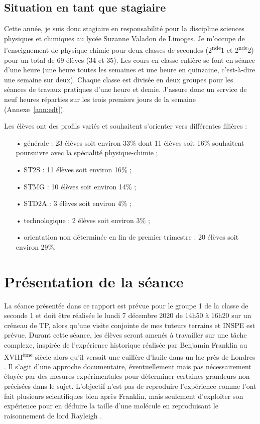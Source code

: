 \documentclass[12pt,a4paper, fleqn]{report}
\newcommand{\seconde}{2\textsuperscript{nde}}
\begin{document}
\subsection{Situation en tant que stagiaire}

Cette année, je suis donc stagiaire en responsabilité pour la discipline sciences physiques et chimiques au lycée Suzanne Valadon de Limoges.
Je m'occupe de l'enseignement de physique-chimie pour deux classes de secondes (\seconde1 et \seconde2) pour un total de 69 élèves (34 et 35).
Les cours en classe entière se font en séance d'une heure (une heure toutes les semaines et une heure en quinzaine, c'est-à-dire une semaine sur deux).
Chaque classe est divisée en deux groupes pour les séances de travaux pratiques d'une heure et demie.
J'assure donc un service de neuf heures réparties sur les trois premiers jours de la semaine (Annexe~\ref{ann:edt}).

Les élèves ont des profils variés et souhaitent s'orienter vers différentes filières :
\begin{itemize}
\item[•] générale : 23 élèves soit environ \unit{33}{\%} dont 11 élèves soit \unit{16}{\%} souhaitent poursuivre avec la spécialité physique-chimie ;
\item[•] ST2S : 11 élèves soit environ \unit{16}{\%} ;
\item[•] STMG : 10 élèves soit environ \unit{14}{\%} ;
\item[•] STD2A : 3 élèves soit environ \unit{4}{\%} ;
\item[•] technologique : 2 élèves soit environ \unit{3}{\%} ;
\item[•] orientation non déterminée en fin de premier trimestre : 20 élèves soit environ \unit{29}{\%}.
\end{itemize}

\section{Présentation de la séance}

La séance présentée dans ce rapport est prévue pour le groupe 1 de la classe de seconde 1 et doit être réalisée le lundi 7 décembre 2020 de 14h50 à 16h20 sur un créneau de TP, alors qu'une visite conjointe de mes tuteurs terrains et INSPE est prévue.
Durant cette séance, les élèves seront amenés à travailler sur une tâche complexe, inspirée de l'expérience historique réalisée par Benjamin Franklin au XVIII\textsuperscript{ème} siècle alors qu'il versait une cuillère d'huile dans un lac près de Londres \cite{Franklin1773a}.
Il s'agit d'une approche documentaire, éventuellement mais pas nécessairement étayée par des mesures expérimentales pour déterminer certaines grandeurs non précisées dans le sujet.
L'objectif n'est pas de reproduire l'expérience comme l'ont fait plusieurs scientifiques bien après Franklin, mais seulement d'exploiter son expérience pour en déduire la taille d'une molécule en reproduisant le raisonnement de lord Rayleigh \cite{Rayleigh1899}.
\end{document}
